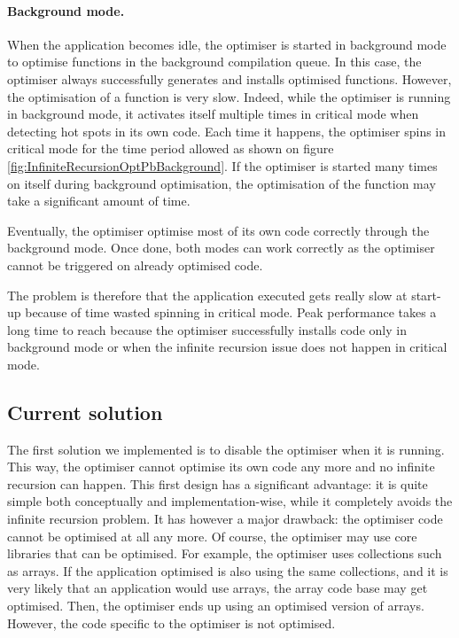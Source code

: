 \documentclass[a4paper,12pt,twoside]{../includes/ThesisStyle}
\begin{document}
\paragraph{Background mode.} When the application becomes idle, the optimiser is started in background mode to optimise functions in the background compilation queue. In this case, the optimiser always successfully generates and installs optimised functions. However, the optimisation of a function is very slow. Indeed, while the optimiser is running in background mode, it activates itself multiple times in critical mode when detecting hot spots in its own code. Each time it happens, the optimiser spins in critical mode for the time period allowed as shown on figure \ref{fig:InfiniteRecursionOptPbBackground}. If the optimiser is started many times on itself during background optimisation, the optimisation of the function may take a significant amount of time. 

Eventually, the optimiser optimise most of its own code correctly through the background mode. Once done, both modes can work correctly as the optimiser cannot be triggered on already optimised code.

The problem is therefore that the application executed gets really slow at start-up because of time wasted spinning in critical mode. Peak performance takes a long time to reach because the optimiser successfully installs code only in background mode or when the infinite recursion issue does not happen in critical mode. 

\subsection{Current solution}

The first solution we implemented is to disable the optimiser when it is running. This way, the optimiser cannot optimise its own code any more and no infinite recursion can happen. This first design has a significant advantage: it is quite simple both conceptually and implementation-wise, while it completely avoids the infinite recursion problem. It has however a major drawback: the optimiser code cannot be optimised at all any more. Of course, the optimiser may use core libraries that can be optimised. For example, the optimiser uses collections such as arrays. If the application optimised is also using the same collections, and it is very likely that an application would use arrays, the array code base may get optimised. Then, the optimiser ends up using an optimised version of arrays. However, the code specific to the optimiser is not optimised.
\end{document}
